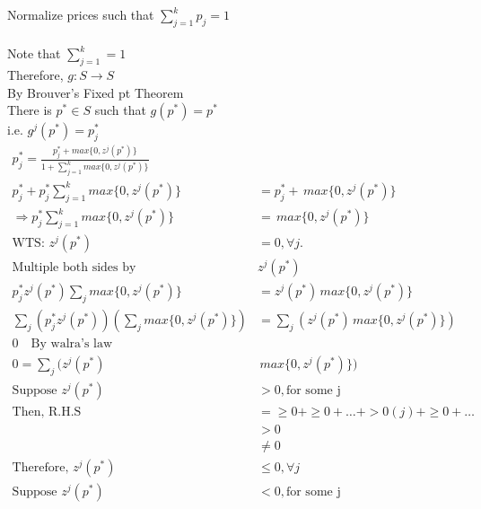 \documentclass[letterpaper,13pt,single,pdftex]{scrartcl}
\begin{document}
Normalize prices such that $\sum\limits_{j=1}^{k} p_j= 1$\\
\\
Note that $\sum\limits_{j=1}^{k} =1$\\
Therefore, $g: S\rightarrow S$\\
By Brouver's Fixed pt Theorem\\
There is $p^* \in S$ such that $g(p^*) = p^*$\\
i.e. $g^j(p^*) = p_j^*$
\begin{align*}
p^*_j = \frac{p_j^*+max\{0,z^j(p^*)\}}{1+\sum\limits_{j=1}^{k}max\{0,z^j(p^*)\}} \\
    p_j^* + p_j^* \sum\limits_{j=1}^{k}max\{0,z^j(p^*)\} &= p_j^* +\,max\{0,z^j(p^*)\}\\
    \Rightarrow p_j^*\sum\limits_{j=1}^{k}max\{0,z^j(p^*)\} &=\,max\{0,z^j(p^*)\}\\
    \text{WTS: } z^j(p^*) &= 0, \forall j.\\
    \text{Multiple both sides by } & z^j(p^*)\\
    p_j^*z^j(p^*) \sum\limits_{j}max\{0,z^j(p^*)\} &= z^j(p^*) \,max\{0,z^j(p^*)\}\\
    \sum\limits_j( p_j^*z^j(p^*) )(\sum\limits_{j}max\{0,z^j(p^*)\})&= \sum\limits_j(z^j(p^*) \,max\{0,z^j(p^*)\})\\
   0 \quad \text{By walra's law} \quad \qquad &\\
   0 =\sum\limits_j(z^j(p^*)&\,max\{0,z^j(p^*)\})\\
   \text{Suppose } z^j(p^*)&> 0, \text{for some j}\\
   \text{Then, R.H.S}&= \ge 0+\ge 0+ \dots +> 0(j) +\ge 0+\dots\\
   &>0\\
   &\ne 0\\
   \text{Therefore, }z^j(p^*) &\le 0, \forall j\\
   \text{Suppose } z^j(p^*) &< 0, \text{for some j}
   \end{align*}
\end{document}
